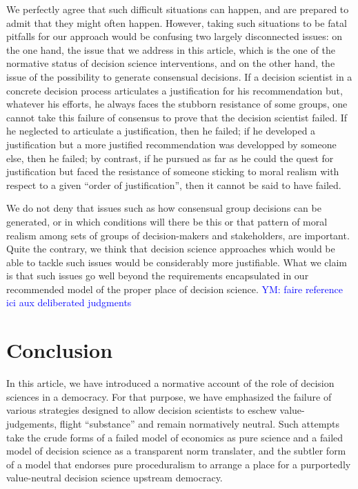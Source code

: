 \documentclass[preprint, french, english, 11pt, authoryear]{elsarticle}%
\newcommand{\commentYM}[1]{\textcolor{blue}{YM: #1}}
\begin{document}
We perfectly agree that such difficult situations can happen, and are prepared to admit that they might often happen. However, taking such situations to be fatal pitfalls for our approach would be confusing two largely disconnected issues: on the one hand, the issue that we address in this article, which is the one of the normative status of decision science interventions, and on the other hand, the issue of the possibility to generate consensual decisions. If a decision scientist in a concrete decision process articulates a justification for his recommendation but, whatever his efforts, he always faces the stubborn resistance of some groups, one cannot take this failure of consensus to prove that the decision scientist failed. If he neglected to articulate a justification, then he failed; if he developed a justification but a more justified recommendation was developped by someone else, then he failed; by contrast, if he pursued as far as he could the quest for justification but faced the resistance of someone sticking to moral realism with respect to a given ``order of justification'', then it cannot be said to have failed.

We do not deny that issues such as how consensual group decisions can be generated, or in which conditions will there be this or that pattern of moral realism among sets of groups of decision-makers and stakeholders, are important. Quite the contrary, we think that decision science approaches which would be able to tackle such issues would be considerably more justifiable. What we claim is that such issues go well beyond the requirements encapsulated in our recommended model of the proper place of decision science.
\commentYM{faire reference ici aux deliberated judgments}

\section{Conclusion}
In this article, we have introduced a normative account of the role of decision sciences in a democracy. For that purpose, we have emphasized the failure of various strategies designed to allow decision scientists to eschew value-judgements, flight ``substance'' and remain normatively neutral. Such attempts take the crude forms of a failed model of economics as pure science and a failed model of decision science as a transparent norm translater, and the subtler form of a model that endorses pure proceduralism to arrange a place for a purportedly value-neutral decision science upstream democracy.
\end{document}
